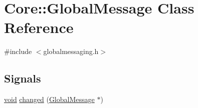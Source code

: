 \hypertarget{class_core_1_1_global_message}{\section{\-Core\-:\-:\-Global\-Message \-Class \-Reference}
\label{class_core_1_1_global_message}
}


{\ttfamily \#include $<$globalmessaging.\-h$>$}

\subsection*{\-Signals}
\begin{DoxyCompactItemize}
\item 
\hyperlink{group___u_a_v_objects_plugin_ga444cf2ff3f0ecbe028adce838d373f5c}{void} \hyperlink{group___core_plugin_ga7fa44bc2a2dc20b8a175e2bb0ca0f042}{changed} (\hyperlink{class_core_1_1_global_message}{\-Global\-Message} $\ast$)
\end{DoxyCompactItemize}
